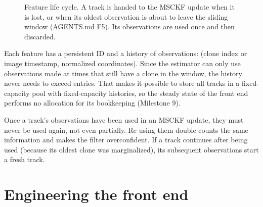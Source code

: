 \begin{figure}[h]
\centering
{}
\caption{Feature life cycle. A track is handed to the MSCKF update when it is lost, or when its oldest observation is
about to leave the sliding window (AGENTS.md F5). Its observations are used once and then discarded.}
\label{fig:lifecycle}
\end{figure}

Each feature has a persistent ID and a history of observations: (clone index or image timestamp, normalized
coordinates). Since the estimator can only use observations made at times that still have a clone in the window,
the history never needs to exceed  entries. That makes it possible to store all tracks in a
fixed-capacity pool with fixed-capacity histories, so the steady state of the front end performs no allocation for
its bookkeeping (Milestone 9).

\begin{pitfall}
Once a track's observations have been used in an MSCKF update, they must never be used again, not even partially.
Re-using them double counts the same information and makes the filter overconfident. If a track continues after being
used (because its oldest clone was marginalized), its subsequent observations start a fresh track.
\end{pitfall}

\section{Engineering the front end}

